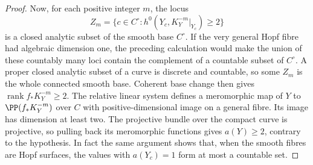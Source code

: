 \begin{proof}
Now, for each positive integer $m$, the locus
\[
Z_m=\{c\in C^\circ:
 h^0(Y_c,K_Y^{-m}|_{Y_c})\ge2\}
\]
is a closed analytic subset of the smooth base $C^\circ$.
If the very general Hopf fibre had algebraic dimension one,
the preceding calculation would make the union of these
countably many loci contain the complement of a countable
subset of $C^\circ$. A proper closed analytic subset of a
curve is discrete and countable, so some $Z_m$ is the whole
connected smooth base. Coherent base change then gives
$\operatorname{rank}f_*K_Y^{-m}\ge2$.
The relative linear system defines a meromorphic map of $Y$
to $\PP(f_*K_Y^{-m})$ over $C$ with positive-dimensional image
on a general fibre. Its image has dimension at least two.
The projective bundle over the compact curve is projective,
so pulling back its meromorphic functions gives $a(Y)\ge2$,
contrary to the hypothesis. In fact the same argument shows
that, when the smooth fibres are Hopf surfaces, the values with
$a(Y_c)=1$ form at most a countable set.
\end{proof}

